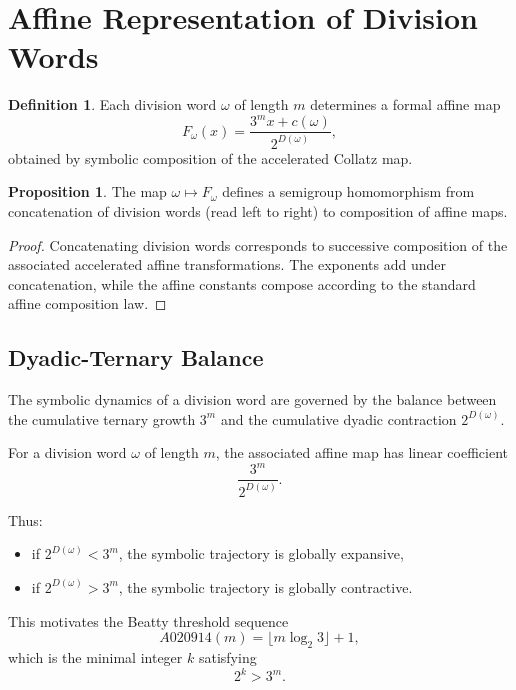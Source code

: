 \documentclass[12pt, oneside]{article}
\numberwithin{equation}{section}
\theoremstyle{definition}
\newtheorem{definition}{Definition}[section]
\newtheorem{proposition}{Proposition}[section]
\theoremstyle{plain}
\theoremstyle{remark}
\begin{document}
\section{Affine Representation of Division Words}
\label{sec:affine-representation}

\begin{definition}
Each division word \(\omega\) of length \(m\) determines a formal affine map
\[
F_\omega(x)=\frac{3^m x+c(\omega)}{2^{D(\omega)}},
\]
obtained by symbolic composition of the accelerated Collatz map.
\end{definition}

\begin{proposition}
The map $\omega \mapsto F_\omega$ defines a semigroup homomorphism from
concatenation of division words (read left to right) to composition of affine maps.
\end{proposition}

\begin{proof}
Concatenating division words corresponds to successive composition
of the associated accelerated affine transformations. The exponents
add under concatenation, while the affine constants compose according
to the standard affine composition law.
\end{proof}

\subsection{Dyadic-Ternary Balance}

The symbolic dynamics of a division word are governed by the balance
between the cumulative ternary growth \(3^m\) and the cumulative dyadic
contraction \(2^{D(\omega)}\).

For a division word \(\omega\) of length \(m\), the associated affine map
has linear coefficient
\[
\frac{3^m}{2^{D(\omega)}}.
\]

Thus:
\begin{itemize}
\item if \(2^{D(\omega)} < 3^m\), the symbolic trajectory is globally expansive,
\item if \(2^{D(\omega)} > 3^m\), the symbolic trajectory is globally contractive.
\end{itemize}

This motivates the Beatty threshold sequence
\[
A020914(m)=\lfloor m\log_2 3\rfloor+1,
\]
which is the minimal integer \(k\) satisfying
\[
2^k>3^m.
\]
\end{document}
